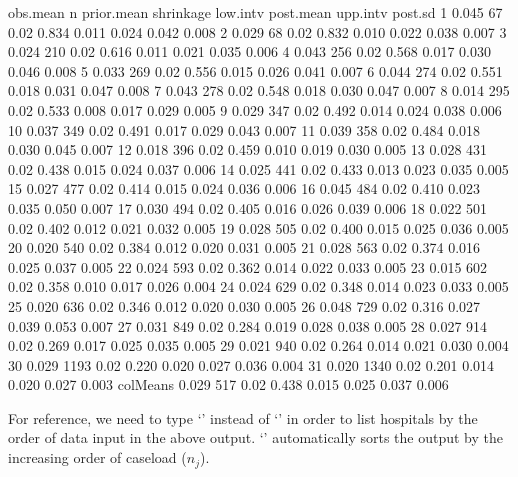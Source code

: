 \documentclass[article]{jss}
\begin{document}
\begin{CodeChunk}
\begin{CodeOutput}
         obs.mean    n prior.mean shrinkage low.intv post.mean upp.intv post.sd
1           0.045   67       0.02     0.834    0.011     0.024    0.042   0.008
2           0.029   68       0.02     0.832    0.010     0.022    0.038   0.007
3           0.024  210       0.02     0.616    0.011     0.021    0.035   0.006
4           0.043  256       0.02     0.568    0.017     0.030    0.046   0.008
5           0.033  269       0.02     0.556    0.015     0.026    0.041   0.007
6           0.044  274       0.02     0.551    0.018     0.031    0.047   0.008
7           0.043  278       0.02     0.548    0.018     0.030    0.047   0.007
8           0.014  295       0.02     0.533    0.008     0.017    0.029   0.005
9           0.029  347       0.02     0.492    0.014     0.024    0.038   0.006
10          0.037  349       0.02     0.491    0.017     0.029    0.043   0.007
11          0.039  358       0.02     0.484    0.018     0.030    0.045   0.007
12          0.018  396       0.02     0.459    0.010     0.019    0.030   0.005
13          0.028  431       0.02     0.438    0.015     0.024    0.037   0.006
14          0.025  441       0.02     0.433    0.013     0.023    0.035   0.005
15          0.027  477       0.02     0.414    0.015     0.024    0.036   0.006
16          0.045  484       0.02     0.410    0.023     0.035    0.050   0.007
17          0.030  494       0.02     0.405    0.016     0.026    0.039   0.006
18          0.022  501       0.02     0.402    0.012     0.021    0.032   0.005
19          0.028  505       0.02     0.400    0.015     0.025    0.036   0.005
20          0.020  540       0.02     0.384    0.012     0.020    0.031   0.005
21          0.028  563       0.02     0.374    0.016     0.025    0.037   0.005
22          0.024  593       0.02     0.362    0.014     0.022    0.033   0.005
23          0.015  602       0.02     0.358    0.010     0.017    0.026   0.004
24          0.024  629       0.02     0.348    0.014     0.023    0.033   0.005
25          0.020  636       0.02     0.346    0.012     0.020    0.030   0.005
26          0.048  729       0.02     0.316    0.027     0.039    0.053   0.007
27          0.031  849       0.02     0.284    0.019     0.028    0.038   0.005
28          0.027  914       0.02     0.269    0.017     0.025    0.035   0.005
29          0.021  940       0.02     0.264    0.014     0.021    0.030   0.004
30          0.029 1193       0.02     0.220    0.020     0.027    0.036   0.004
31          0.020 1340       0.02     0.201    0.014     0.020    0.027   0.003
colMeans    0.029  517       0.02     0.438    0.015     0.025    0.037   0.006
\end{CodeOutput}
\end{CodeChunk}
For reference, we need to type `' instead of `' in order to list hospitals by the order of data input in the above output. `' automatically sorts the output by the increasing order of caseload ($n_{j}$). 
\\
\end{document}
